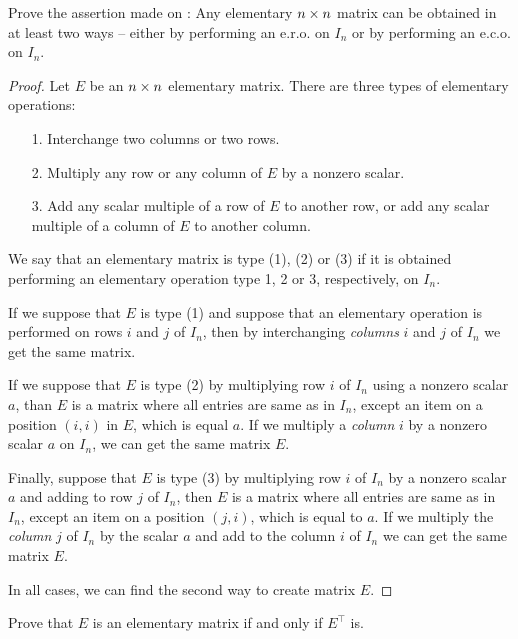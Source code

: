 \begin{exercise} \label{exercise 3.1.4}
Prove the assertion made on :
Any elementary \(n \times n\) matrix can be obtained in at least two ways -- either by performing an e.r.o. on \(I_n\) or by performing an e.c.o. on \(I_n\).
\end{exercise}

\begin{proof}
Let \(E\) be an \(n \times n\) elementary matrix.
There are three types of elementary operations:
\begin{enumerate}
\item[1.] Interchange two columns or two rows.
\item[2.] Multiply any row or any column of \(E\) by a nonzero scalar.
\item[3.] Add any scalar multiple of a row of \(E\) to another row, or add any scalar multiple of a column of \(E\) to another column.
\end{enumerate}

We say that an elementary matrix is type (1), (2) or (3) if it is obtained performing an elementary operation type 1, 2 or 3, respectively, on \(I_n\).

If we suppose that \(E\) is type (1) and suppose that an elementary operation is performed on rows \(i\) and \(j\) of  \(I_n\),
then by interchanging \emph{columns} \(i\) and \(j\) of \(I_n\) we get the same matrix.

If we suppose that \(E\) is type (2) by multiplying row \(i\) of \(I_n\) using a nonzero scalar \(a\), than \(E\) is a matrix where all entries are same as in \(I_n\), except an item on a position \((i, i)\) in \(E\), which is equal \(a\).
If we multiply a \emph{column} \(i\) by a nonzero scalar \(a\) on \(I_n\), we can get the same matrix \(E\).

Finally, suppose that \(E\) is type (3) by multiplying row \(i\) of \(I_n\) by a nonzero scalar \(a\) and adding to row \(j\) of \(I_n\),
then \(E\) is a matrix where all entries are same as in \(I_n\), except an item on a position \((j, i)\), which is equal to \(a\).
If we multiply the \emph{column} \(j\) of \(I_n\) by the scalar \(a\) and add to the column \(i\) of \(I_n\) we can get the same matrix \(E\).

In all cases, we can find the second way to create matrix \(E\).
\end{proof}

\begin{exercise} \label{exercise 3.1.5}
Prove that \(E\) is an elementary matrix if and only if \(E^\top\) is.
\end{exercise}

